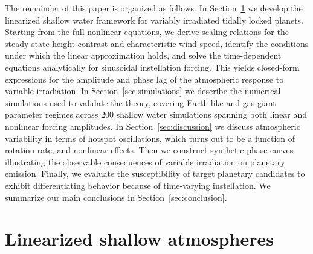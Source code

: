 \documentclass[trackchanges,twocolumn]{aastex7}
\begin{document}
The remainder of this paper is organized as follows. In Section~\ref{sec:theory} we develop the linearized shallow water framework for variably irradiated tidally locked planets. Starting from the full nonlinear equations, we derive scaling relations for the steady-state height contrast and characteristic wind speed, identify the conditions under which the linear approximation holds, and solve the time-dependent equations analytically for sinusoidal instellation forcing. This yields closed-form expressions for the amplitude and phase lag of the atmospheric response to variable irradiation. In Section~\ref{sec:simulations} we describe the numerical simulations used to validate the theory, covering Earth-like and gas giant parameter regimes across 200 shallow water simulations spanning both linear and nonlinear forcing amplitudes. In Section~\ref{sec:discussion} we discuss atmospheric variability in terms of hotspot oscillations, which turns out to be a function of  rotation rate, and nonlinear effects. Then we construct synthetic phase curves illustrating the observable consequences of variable irradiation on planetary emission. Finally, we evaluate the susceptibility of target planetary candidates to exhibit differentiating behavior because of time-varying instellation. We summarize our main conclusions in Section~\ref{sec:conclusion}.

\section{Linearized shallow atmospheres}
\label{sec:theory}
\end{document}
